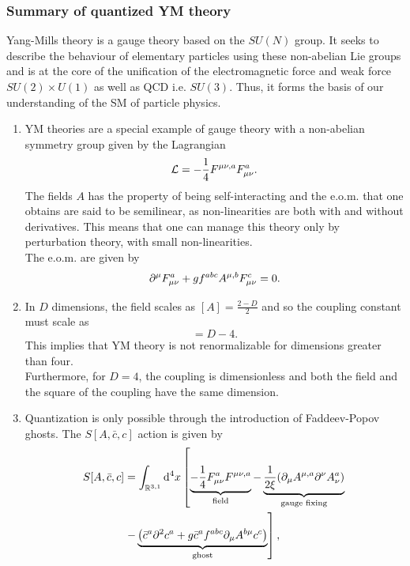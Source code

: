 \subsubsection{Summary of quantized YM theory}
Yang-Mills theory is a gauge theory based on the $SU(N)$ group. It seeks to describe the behaviour of elementary particles using these non-abelian Lie groups and is at the core of the unification of the electromagnetic force and weak force $SU(2) \times U(1)$ as well as QCD i.e. $SU(3)$. Thus, it forms the basis of our understanding of the SM of particle physics.
\begin{enumerate}
\item 
YM theories are a special example of gauge theory with a non-abelian symmetry group given by the Lagrangian
\begin{equation}
	\mathcal{L} = -\frac{1}{4} F^{\mu \nu, a} F^a_{\mu \nu}.
\end{equation}
The fields $A$ has the property of being self-interacting and the e.o.m. that one obtains are said to be semilinear, as non-linearities are both with and without derivatives. This means that one can manage this theory only by perturbation theory, with small non-linearities.\\
The e.o.m. are given by
\begin{equation}
	\partial^\mu F^a_{\mu \nu} + g f^{abc} A^{\mu,b} F^c_{\mu \nu} =0.
\end{equation}
\item 
In $D$ dimensions, the field scales as $[A] = \frac{2-D}{2}$ and so the coupling constant must scale as 
\begin{equation}
	[g^2] = D-4.
\end{equation}
This implies that YM theory is not renormalizable for dimensions greater than four.\\
Furthermore, for $D=4$, the coupling is dimensionless and both the field and the square of the coupling have the same dimension.
\item 
Quantization is only possible through the introduction of Faddeev-Popov ghosts. The $S[A,\bar{c},c]$ action is given by
\begin{align}
S[A,\bar{c}, c] &= \int_{\mR^{3,1}} \md^4 x \left[\underbrace{-\frac{1}{4} F^a\munu F^{\mu \nu,a} }_{\text{field}} -\underbrace{\frac{1}{2 \xi} (\partial_\mu A^{\mu, a} \partial^\nu A^a_\nu )}_{\text{gauge fixing}} \right. \\ 
&\left. - \underbrace{\left(\bar{c}^a \partial^2 c^a+ g \bar{c}^a f^{abc} \partial_\mu A^{b \mu} c^c \right)}_{\text{ghost}}\right], 

\end{align}
\end{enumerate}
